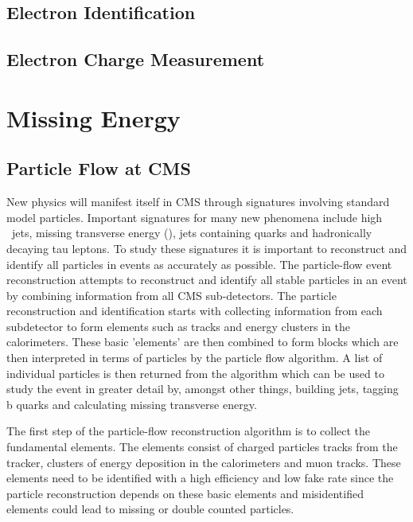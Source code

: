 \subsection{Electron Identification}

\subsection{Electron Charge Measurement}

\section{Missing Energy}

\subsection{Particle Flow at CMS}

New physics will manifest itself in CMS through signatures involving standard
model particles. Important signatures for many new phenomena include high \Pt\
jets, missing transverse energy (\met), jets containing \Pbottom quarks and
hadronically decaying tau leptons. To study these signatures it is important to
reconstruct and identify all particles in events as accurately as possible. The
particle-flow event reconstruction attempts to reconstruct and identify all
stable particles in an event by combining information from all CMS
sub-detectors. The particle reconstruction and identification starts with
collecting information from each subdetector to form elements such as tracks
and energy clusters in the calorimeters. These basic 'elements' are then
combined to form blocks which are then interpreted in terms of particles by the
particle flow algorithm. A list of individual particles is then returned from
the algorithm which can be used to study the event in greater detail by,
amongst other things, building jets, tagging b quarks and calculating missing
transverse energy.\cite{PF}

The first step of the particle-flow reconstruction algorithm is to collect the
fundamental elements. The elements consist of charged particles tracks from the
tracker, clusters of energy deposition in the calorimeters and muon tracks.
These elements need to be identified with a high efficiency and low fake rate
since the particle reconstruction depends on these basic elements and
misidentified elements could lead to missing or double counted
particles.\cite{PF}

